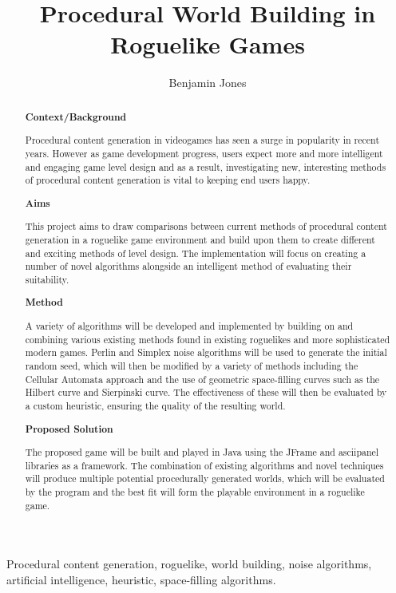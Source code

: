 \documentclass[12pt,a4paper]{article}
\title{Procedural World Building in Roguelike Games}
\author{Benjamin Jones}
\begin{document}
\maketitle

\begin{abstract}

{\bf Context/Background}

Procedural content generation in videogames has seen a surge in popularity in recent years. However as game development progress, users expect more and more intelligent and engaging game level design and as a result, investigating new, interesting methods of procedural content generation is vital to keeping end users happy.

{\bf Aims}

This project aims to draw comparisons between current methods of procedural content generation in a roguelike game environment and build upon them to create different and exciting methods of level design. The implementation will focus on creating a number of novel algorithms alongside an intelligent method of evaluating their suitability. 

{\bf Method}

A variety of algorithms will be developed and implemented by building on and combining various existing methods found in existing roguelikes and more sophisticated modern games. Perlin and Simplex noise algorithms will be used to generate the initial random seed, which will then be modified by a variety of methods including the Cellular Automata approach and the use of geometric space-filling curves such as the Hilbert curve and Sierpinski curve. The effectiveness of these will then be evaluated by a custom heuristic, ensuring the quality of the resulting world. 

{\bf Proposed Solution}

The proposed game will be built and played in Java using the JFrame and asciipanel libraries as a framework. The combination of existing algorithms and novel techniques will produce multiple potential procedurally generated worlds, which will be evaluated by the program and the best fit will form the playable environment in a roguelike game. 

\end{abstract}

\begin{keywords}
Procedural content generation, roguelike, world building, noise algorithms, artificial intelligence, heuristic, space-filling algorithms.
\end{keywords}
\end{document}
